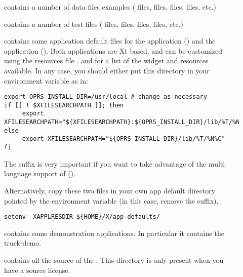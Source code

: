 \begin{description}
\item [] contains a number of data files examples (
files,  files,  files,  files, etc.)

\item [] contains a number of test files (
files,  files,  files,  files, etc.)

\item [] contains some application default files for the
\XPK{} application () and the \OPE{} application
(). Both applications are Xt based, and can be customized
using the resources file \cite{Xt-manual,Xlib-manual,Motif-manual}.  and  for a list of the widget and resources available.
In any case, you should either put this directory in your
 environment variable as in:

\begin{verbatim}
export OPRS_INSTALL_DIR=/usr/local # change as necessary
if [[ ! $XFILESEARCHPATH ]]; then
     export XFILESEARCHPATH="${XFILESEARCHPATH}:${OPRS_INSTALL_DIR}/lib/%T/%N%C"
else
     export XFILESEARCHPATH="${OPRS_INSTALL_DIR}/lib/%T/%N%C"
fi
\end{verbatim}


The  suffix is very important if you want to take advantage of the
multi language support of \COPRS{} ().

Alternatively, copy these two files in your own app default directory pointed by the
environment variable  (in this case, remove the 
suffix).

\begin{verbatim}
setenv  XAPPLRESDIR ${HOME}/X/app-defaults/
\end{verbatim}

\item [] contains some demonstration applications. In
particular it contains the truck-demo.

\item [] contains all the source of the \COPRSDE{}. This directory is
only present when you have a source license.

\end{description}

